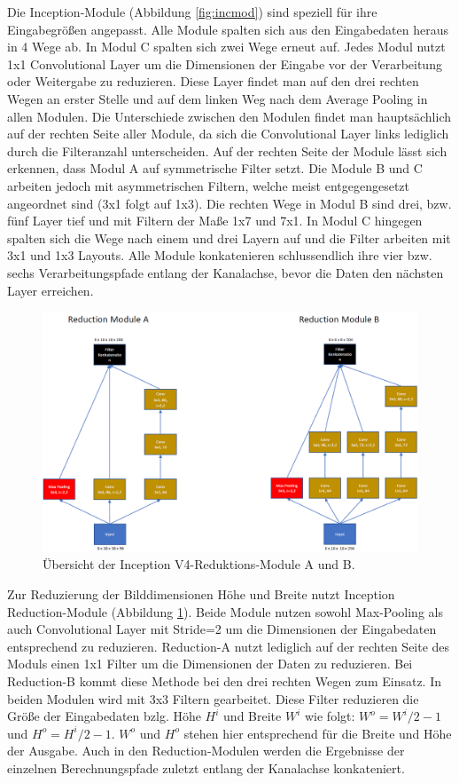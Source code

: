 Die Inception-Module (Abbildung \ref{fig:incmod}) sind speziell für ihre Eingabegrößen angepasst. Alle Module spalten sich aus den Eingabedaten heraus in 4 Wege ab. In Modul C spalten sich zwei Wege erneut auf. Jedes Modul nutzt 1x1 Convolutional Layer um die Dimensionen der Eingabe vor der Verarbeitung oder Weitergabe zu reduzieren. Diese Layer findet man auf den drei rechten Wegen an erster Stelle und auf dem linken Weg nach dem Average Pooling in allen Modulen. Die Unterschiede zwischen den Modulen findet man hauptsächlich auf der rechten Seite aller Module, da sich die Convolutional Layer links lediglich durch die Filteranzahl unterscheiden. Auf der rechten Seite der Module lässt sich erkennen, dass Modul A auf symmetrische Filter setzt. Die Module B und C arbeiten jedoch mit asymmetrischen Filtern, welche meist entgegengesetzt angeordnet sind (3x1 folgt auf 1x3). Die rechten Wege in Modul B sind drei, bzw. fünf Layer tief und mit Filtern der Maße 1x7 und 7x1. In Modul C hingegen spalten sich die Wege nach einem und drei Layern auf und die Filter arbeiten mit 3x1 und 1x3 Layouts. Alle Module konkatenieren schlussendlich ihre vier bzw. sechs Verarbeitungspfade entlang der Kanalachse, bevor die Daten den nächsten Layer erreichen.

\begin{figure}[H]
\centering
\includegraphics[scale=0.45]{pictures/Inception/Reduction}
\caption[Caption for LOF]{Übersicht der Inception V4-Reduktions-Module A und B.}\label{fig:incred}
\end{figure}

Zur Reduzierung der Bilddimensionen Höhe und Breite nutzt Inception Reduction-Module (Abbildung \ref{fig:incred}). Beide Module nutzen sowohl Max-Pooling als auch Convolutional Layer mit Stride=2 um die Dimensionen der Eingabedaten entsprechend zu reduzieren. Reduction-A nutzt lediglich auf der rechten Seite des Moduls einen 1x1 Filter um die Dimensionen der Daten zu reduzieren. Bei Reduction-B kommt diese Methode bei den drei rechten Wegen zum Einsatz. In beiden Modulen wird mit 3x3 Filtern gearbeitet. Diese Filter reduzieren die Größe der Eingabedaten bzlg. Höhe $H^i$ und Breite $W^i$ wie folgt: $W^o = W^i / 2 - 1$ und $H^o = H^i / 2 - 1$. $W^o$ und $H^o$ stehen hier entsprechend für die Breite und Höhe der Ausgabe. Auch in den Reduction-Modulen werden die Ergebnisse der einzelnen Berechnungspfade zuletzt entlang der Kanalachse konkateniert. 

